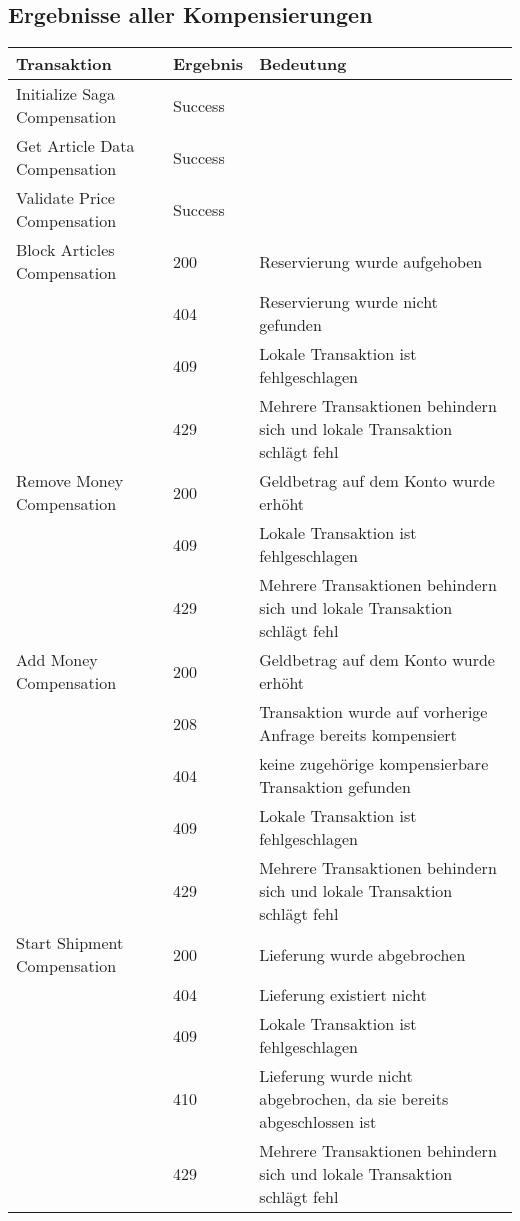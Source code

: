 \subsection{Ergebnisse aller Kompensierungen}
\begin{center}
	\begin{longtable}[h]{|p{5.5cm}|p{1.5cm}|p{8.5cm}|}
		\hline
		Transaktion 						& Ergebnis 	& Bedeutung \\ \hline
		Initialize Saga Compensation	 	& Success 	& \\ \hline
		Get Article Data Compensation	 	& Success 	& \\ \hline	
		Validate Price Compensation	 		& Success 	& \\ \hline
		Block Articles Compensation	 		& 200	 	& Reservierung wurde aufgehoben \\
		& 404		& Reservierung wurde nicht gefunden \\
		& 409		& Lokale Transaktion ist fehlgeschlagen \\
		& 429 		& Mehrere Transaktionen behindern sich und lokale Transaktion schlägt fehl \\ \hline
		Remove Money Compensation		 	& 200		& Geldbetrag auf dem Konto wurde erhöht \\
		& 409		& Lokale Transaktion ist fehlgeschlagen \\
		& 429		& Mehrere Transaktionen behindern sich und lokale Transaktion schlägt fehl \\ \hline
		Add Money Compensation		 		& 200		& Geldbetrag auf dem Konto wurde erhöht \\
		& 208		& Transaktion wurde auf vorherige Anfrage bereits kompensiert \\
		& 404		& keine zugehörige kompensierbare Transaktion gefunden \\
		& 409		& Lokale Transaktion ist fehlgeschlagen \\
		& 429		& Mehrere Transaktionen behindern sich und lokale Transaktion schlägt fehl \\ \hline
		Start Shipment Compensation	 		& 200	 	& Lieferung wurde abgebrochen \\
		& 404		& Lieferung existiert nicht \\
		& 409		& Lokale Transaktion ist fehlgeschlagen \\
		& 410		& Lieferung wurde nicht abgebrochen, da sie bereits abgeschlossen ist \\
		& 429		& Mehrere Transaktionen behindern sich und lokale Transaktion schlägt fehl \\ \hline
	\end{longtable}
\end{center}
\FloatBarrier